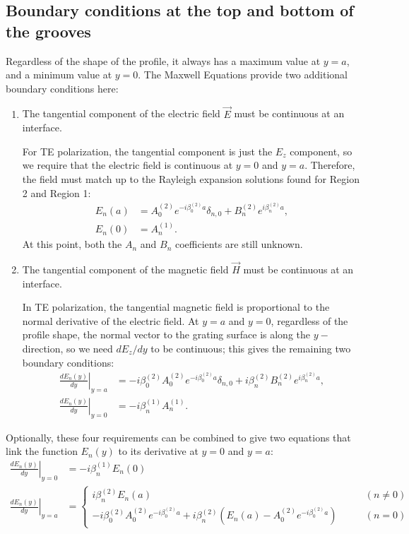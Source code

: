 \subsection{Boundary conditions at the top and bottom of the grooves}
Regardless of the shape of the profile, it always has a maximum value at $y=a$, and a minimum value at $y=0$.  The Maxwell Equations provide two additional boundary conditions here:
\begin{enumerate}
\item The tangential component of the electric field $\vec E$ must be continuous at an interface.

For TE polarization, the tangential component is just the $E_z$ component, so we require that the electric field is continuous at $y=0$ and $y=a$.  Therefore, the field must match up to the Rayleigh expansion solutions found for Region 2 and Region 1:
\begin{align}
\label{boundsA1}
E_n(a) &= A_0^{(2)} e^{-i \beta_0^{(2)} a} \delta_{n,0} + B_n^{(2)} e^{i \beta_n^{(2)}a} , \\
\label{bounds01}
E_n(0) &= A_n^{(1)}.
\end{align}
At this point, both the $A_n$ and $B_n$ coefficients are still unknown.

\item The tangential component of the magnetic field $\vec H$ must be continuous at an interface.

In TE polarization, the tangential magnetic field is proportional to the normal derivative of the electric field.  At $y=a$ and $y=0$, regardless of the profile shape, the normal vector to the grating surface is along the $y-$direction, so we need $dE_z/dy$ to be continuous; this gives the remaining two boundary conditions:
\begin{align}
\label{boundsA2}
\left. \frac{d E_n(y)}{dy} \right|_{y=a} &= -i \beta_0^{(2)} A_0^{(2)} e^{-i\beta_0^{(2)}a} \delta_{n,0} + i \beta_n^{(2)} B_n^{(2)} e^{i \beta_n^{(2)}a} ,\\
\label{bounds02}
\left. \frac{d E_n(y)}{dy} \right|_{y=0} &= - i \beta_n^{(1)} A_n^{(1)}.
\end{align}

\end{enumerate}

Optionally, these four requirements can be combined to give two equations that link the function $E_n(y)$ to its derivative at $y=0$ and $y=a$:
\begin{align}
\left. \frac{dE_n(y)}{dy} \right|_{y=0} &= - i \beta_n^{(1)} E_n(0) \\
\left. \frac{d E_n(y)}{dy} \right|_{y=a} &=  \left\{   \begin{array}{cl}      i \beta_n^{(2)} E_n(a)   &\qquad (n\neq 0)  \\ -i \beta_0^{(2)} A_0^{(2)} e^{-i\beta_0^{(2)}a}  + i \beta_n^{(2)} \left( E_n(a) - A_0^{(2)} e^{-i \beta_0^{(2)} a} \right)  &\qquad (n=0)  \end{array}   \right.
\end{align}

